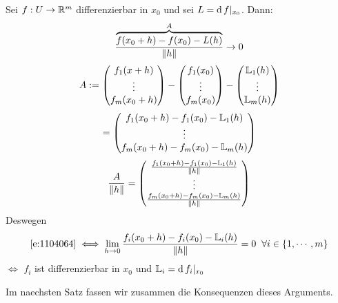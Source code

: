   Sei $f:U\rightarrow\mathbb{R}^m$ differenzierbar in $x_0$ und sei $L=\operatorname{d} f|_{x_0}$. Dann:
  \begin{equation}
    \label{e:1104064}
    \frac{\overbrace{f(x_0+h)-f(x_0)-L(h)}^A}{\left\| h \right\|}\rightarrow 0
  \end{equation}
  \[A:= \begin{pmatrix}
    f_1(x+h) \\ \vdots \\ f_m(x_0+h)
  \end{pmatrix} - \begin{pmatrix}
    f_1(x_0)\\ \vdots \\ f_m(x_0)
  \end{pmatrix} - \begin{pmatrix}
    \mathbb{L}_1(h) \\ \vdots \\ \mathbb{L}_m(h)
  \end{pmatrix}\]
  \[ = \begin{pmatrix}
    f_1(x_0+h)-f_1(x_0)-\mathbb{L}_1(h)\\
    \vdots \\
    f_m(x_0+h)-f_m(x_0)-\mathbb{L}_m(h)\\
  \end{pmatrix} \]
  \[\frac{A}{\left\| h \right\|}= \begin{pmatrix}
    \frac{f_1(x_0+h)-f_1(x_0)-\mathbb{L}_1(h)}{\left\| h \right\|} \\
    \vdots \\
    \frac{f_m(x_0+h)-f_m(x_0)-\mathbb{L}_m(h)}{\left\| h \right\|} \\
  \end{pmatrix}\]
  Deswegen
  \[\eqref{e:1104064} \iff \displaystyle\lim_{h\rightarrow0}\frac{f_i(x_0+h)-f_i(x_0)-\mathbb{L}_i(h)}{\left\| h \right\|} = 0\hspace{2mm}\forall i\in \left\{ 1,\cdots,m \right\}\]
  $\iff$ $f_i$ ist differenzierbar in $x_0$ und $\mathbb{L}_i=\operatorname{d} f_i|_{x_0}$

Im naechsten Satz fassen wir zusammen die Konsequenzen dieses Arguments.

